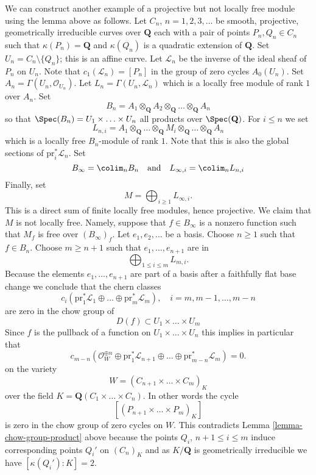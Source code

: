 \noindent
We can construct another example of a projective but not locally free
module using the lemma above as follows. Let
$C_n$, $n = 1, 2, 3, \ldots$ be smooth, projective, geometrically irreducible
curves over $\mathbf{Q}$ each with a pair of points
$P_n, Q_n \in C_n$ such that $\kappa(P_n) = \mathbf{Q}$ and
$\kappa(Q_n)$ is a quadratic extension of $\mathbf{Q}$.
Set $U_n = C_n \setminus \{Q_n\}$; this is an affine curve.
Let $\mathcal{L}_n$ be the inverse of the ideal sheaf of $P_n$
on $U_n$. Note that $c_1(\mathcal{L}_n) = [P_n]$ in the group of
zero cycles $A_0(U_n)$. Set $A_n = \Gamma(U_n, \mathcal{O}_{U_n})$.
Let $L_n = \Gamma(U_n, \mathcal{L}_n)$ which is a locally
free module of rank $1$ over $A_n$. Set
$$
B_n = A_1 \otimes_{\mathbf{Q}} A_2 \otimes_{\mathbf{Q}} \ldots
\otimes_{\mathbf{Q}} A_n
$$
so that $\Spec(B_n) = U_1 \times \ldots \times U_n$ all products
over $\Spec(\mathbf{Q})$. For $i \leq n$ we set
$$
L_{n, i} =
A_1 \otimes_{\mathbf{Q}} \ldots \otimes_{\mathbf{Q}} M_i
\otimes_{\mathbf{Q}} \ldots \otimes_{\mathbf{Q}} A_n
$$
which is a locally free $B_n$-module of rank $1$. Note that this is
also the global sections of $\text{pr}_i^*\mathcal{L}_n$. Set
$$
B_\infty = \colim_n B_n
\quad\text{and}\quad
L_{\infty, i} = \colim_n L_{n, i}
$$
Finally, set
$$
M = \bigoplus\nolimits_{i \geq 1} L_{\infty, i}.
$$
This is a direct sum of finite locally free modules, hence projective.
We claim that $M$ is not locally free. Namely, suppose that
$f \in B_\infty$ is a nonzero function such that $M_f$ is free
over $(B_\infty)_f$. Let $e_1, e_2, \ldots$ be a basis. Choose
$n \geq 1$ such that $f \in B_n$.
Choose $m \geq n + 1$ such that $e_1, \ldots, e_{n + 1}$ are in
$$
\bigoplus\nolimits_{1 \leq i \leq m} L_{m, i}.
$$
Because the elements $e_1, \ldots, e_{n + 1}$ are part of a basis
after a faithfully flat base change we conclude that
the chern classes
$$
c_i(\text{pr}_1^*\mathcal{L}_1 \oplus \ldots \oplus
\text{pr}_m^*\mathcal{L}_m), \quad i = m, m - 1, \ldots, m - n
$$
are zero in the chow group of
$$
D(f) \subset U_1 \times \ldots \times U_m
$$
Since $f$ is the pullback of a function on $U_1 \times \ldots \times U_n$
this implies in particular that
$$
c_{m - n}(\mathcal{O}_W^{\oplus n} \oplus
\text{pr}_1^*\mathcal{L}_{n + 1} \oplus \ldots
\oplus \text{pr}_{m - n}^*\mathcal{L}_m) = 0.
$$
on the variety
$$
W = (C_{n + 1} \times \ldots \times C_m)_K
$$
over the field $K = \mathbf{Q}(C_1 \times \ldots \times C_n)$.
In other words the cycle
$$
[(P_{n + 1} \times \ldots \times P_m)_K]
$$
is zero in the chow group of zero cycles on $W$. This contradicts
Lemma \ref{lemma-chow-group-product}
above because the points $Q_i$, $n + 1 \leq i \leq m$
induce corresponding points $Q_i'$ on $(C_n)_K$ and as $K/\mathbf{Q}$
is geometrically irreducible we have $[\kappa(Q_i') : K] = 2$.

